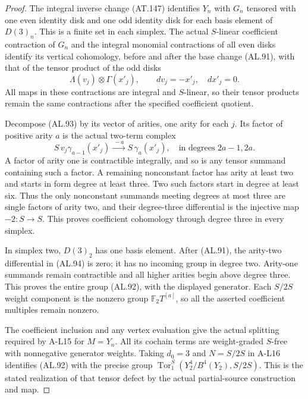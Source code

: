 \begin{proof}
The integral inverse change (AT.147) identifies $Y_n$
with $G_n$ tensored with one even identity disk and
one odd identity disk for each basis element of
$D(3)_n$. This is a finite set in each simplex.
The actual $S$-linear coefficient contraction of $G_n$
and the integral monomial contractions of all even
disks identify its vertical cohomology, before and
after the base change (AL.91), with that of the
tensor product of the odd disks
\[
 \Lambda(v_j)\otimes\Gamma(x'_j),\qquad
                 dv_j=-x'_j,\quad dx'_j=0.
 \tag{AL.93}
\]
All maps in these contractions are integral and
$S$-linear, so their tensor products remain the same
contractions after the specified coefficient quotient.

Decompose (AL.93) by its vector of arities, one arity
for each $j$. Its factor of positive arity $a$ is
the actual two-term complex
\[
 S\,v_j\gamma_{a-1}(x'_j)
       \xrightarrow{\ -a\ }S\,\gamma_a(x'_j),
 \quad\text{in degrees }2a-1,2a.
 \tag{AL.94}
\]
A factor of arity one is contractible integrally,
and so is any tensor summand containing such a
factor. A remaining nonconstant factor has arity
at least two and starts in form degree at least
three. Two such factors start in degree at least
six. Thus the only nonconstant summands meeting
degrees at most three are single factors of arity
two, and their degree-three differential is the
injective map $-2:S\to S$. This proves coefficient
cohomology through degree three in every simplex.

In simplex two, $D(3)_2$ has one basis element.
After (AL.91), the arity-two differential in (AL.94)
is zero; it has no incoming group in degree two.
Arity-one summands remain contractible and all higher
arities begin above degree three. This proves the
entire group (AL.92), with the displayed generator.
Each $S/2S$ weight component is the nonzero group
$\mathbb F_2 T^{[a]}$, so all the asserted coefficient
multiples remain nonzero.

The coefficient inclusion and any vertex evaluation
give the actual splitting required by A-L15 for
$M=Y_n$. All its cochain terms are weight-graded
$S$-free with nonnegative generator weights. Taking
$d_0=3$ and $N=S/2S$ in A-L16 identifies (AL.92)
with the precise group
$\operatorname{Tor}^S_1(Y_2^4/B^4(Y_2),S/2S)$.
This is the stated realization of that tensor defect
by the actual partial-source construction and map.
\end{proof}
